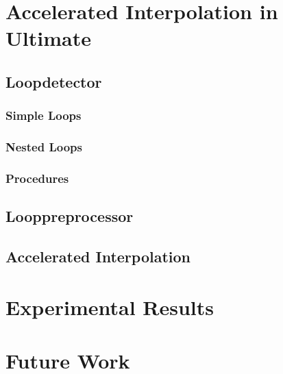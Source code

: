 \documentclass{article}
\begin{document}
\section{Accelerated Interpolation in Ultimate}
\subsection{Loopdetector}
\subsubsection{Simple Loops}

\subsubsection{Nested Loops}

\subsubsection{Procedures}

\subsection{Looppreprocessor}

\subsection{Accelerated Interpolation}


\section{Experimental Results}

\section{Future Work}

\pagebreak
{}



	
\end{document}
